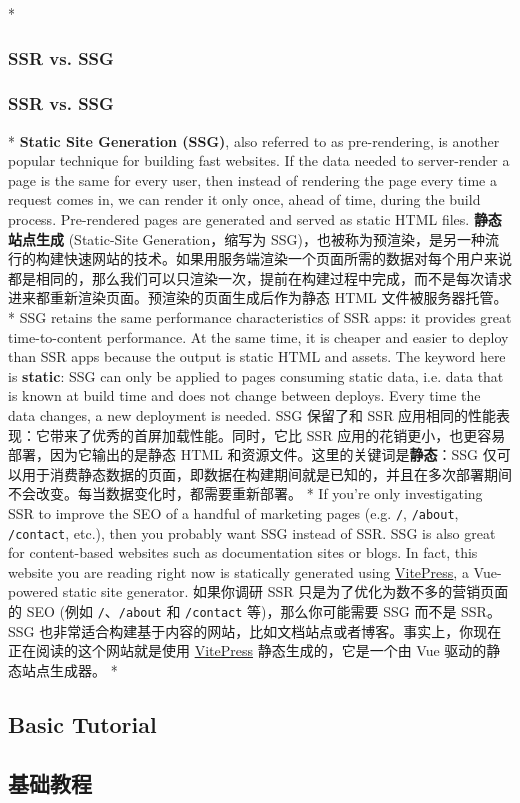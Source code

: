 \begin{paracol}{2} 
\switchcolumn[0]*%
\subsubsection{SSR vs. SSG}
\switchcolumn
\subsubsection{SSR vs. SSG}
\switchcolumn[0]*%
\textbf{Static Site Generation (SSG)}, also referred to as
pre-rendering, is another popular technique for building fast websites.
If the data needed to server-render a page is the same for every user,
then instead of rendering the page every time a request comes in, we can
render it only once, ahead of time, during the build process.
Pre-rendered pages are generated and served as static HTML files.
\switchcolumn
\textbf{静态站点生成} (Static-Site Generation，缩写为
SSG)，也被称为预渲染，是另一种流行的构建快速网站的技术。如果用服务端渲染一个页面所需的数据对每个用户来说都是相同的，那么我们可以只渲染一次，提前在构建过程中完成，而不是每次请求进来都重新渲染页面。预渲染的页面生成后作为静态
HTML 文件被服务器托管。
\switchcolumn[0]*%
SSG retains the same performance characteristics of SSR apps: it
provides great time-to-content performance. At the same time, it is
cheaper and easier to deploy than SSR apps because the output is static
HTML and assets. The keyword here is \textbf{static}: SSG can only be
applied to pages consuming static data, i.e. data that is known at build
time and does not change between deploys. Every time the data changes, a
new deployment is needed.
\switchcolumn
SSG 保留了和 SSR
应用相同的性能表现：它带来了优秀的首屏加载性能。同时，它比 SSR
应用的花销更小，也更容易部署，因为它输出的是静态 HTML
和资源文件。这里的关键词是\textbf{静态}：SSG
仅可以用于消费静态数据的页面，即数据在构建期间就是已知的，并且在多次部署期间不会改变。每当数据变化时，都需要重新部署。
\switchcolumn[0]*%
If you're only investigating SSR to improve the SEO of a handful of
marketing pages (e.g. \texttt{/}, \texttt{/about}, \texttt{/contact},
etc.), then you probably want SSG instead of SSR. SSG is also great for
content-based websites such as documentation sites or blogs. In fact,
this website you are reading right now is statically generated using
\href{https://vitepress.dev/}{VitePress}, a Vue-powered static site
generator.
\switchcolumn
如果你调研 SSR 只是为了优化为数不多的营销页面的 SEO (例如
\texttt{/}、\texttt{/about} 和 \texttt{/contact} 等)，那么你可能需要 SSG
而不是 SSR。SSG
也非常适合构建基于内容的网站，比如文档站点或者博客。事实上，你现在正在阅读的这个网站就是使用
\href{https://vitepress.dev/}{VitePress} 静态生成的，它是一个由 Vue
驱动的静态站点生成器。
\switchcolumn[0]*%
\subsection{Basic Tutorial}
\switchcolumn
\subsection{基础教程}
\end{paracol}

